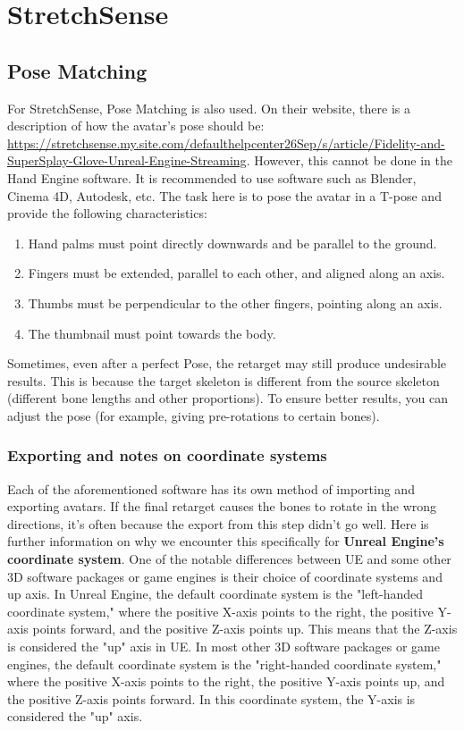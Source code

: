 \documentclass{uva-inf-article}
\begin{document}
\section{StretchSense}
\subsection{Pose Matching}
For StretchSense, Pose Matching is also used. On their website, there is a description of how the avatar's pose should be: \url{https://stretchsense.my.site.com/defaulthelpcenter26Sep/s/article/Fidelity-and-SuperSplay-Glove-Unreal-Engine-Streaming}. However, this cannot be done in the Hand Engine software. It is recommended to use software such as Blender, Cinema 4D, Autodesk, etc. The task here is to pose the avatar in a T-pose and provide the following characteristics:
\begin{enumerate}
    \item Hand palms must point directly downwards and be parallel to the ground.
    \item Fingers must be extended, parallel to each other, and aligned along an axis.
    \item Thumbs must be perpendicular to the other fingers, pointing along an axis.
    \item The thumbnail must point towards the body.
\end{enumerate}

Sometimes, even after a perfect Pose, the retarget may still produce undesirable results. This is because the target skeleton is different from the source skeleton (different bone lengths and other proportions). To ensure better results, you can adjust the pose (for example, giving pre-rotations to certain bones).


\subsubsection{Exporting and notes on coordinate systems}
Each of the aforementioned software has its own method of importing and exporting avatars. If the final retarget causes the bones to rotate in the wrong directions, it's often because the export from this step didn't go well. Here is further information on why we encounter this specifically for  \textbf{Unreal Engine's coordinate system}.
One of the notable differences between UE and some other 3D software packages or game engines is their choice of coordinate systems and up axis.
In Unreal Engine, the default coordinate system is the "left-handed coordinate system," where the positive X-axis points to the right, the positive Y-axis points forward, and the positive Z-axis points up. This means that the Z-axis is considered the "up" axis in UE.
In most other 3D software packages or game engines, the default coordinate system is the "right-handed coordinate system," where the positive X-axis points to the right, the positive Y-axis points up, and the positive Z-axis points forward. In this coordinate system, the Y-axis is considered the "up" axis.
\end{document}
